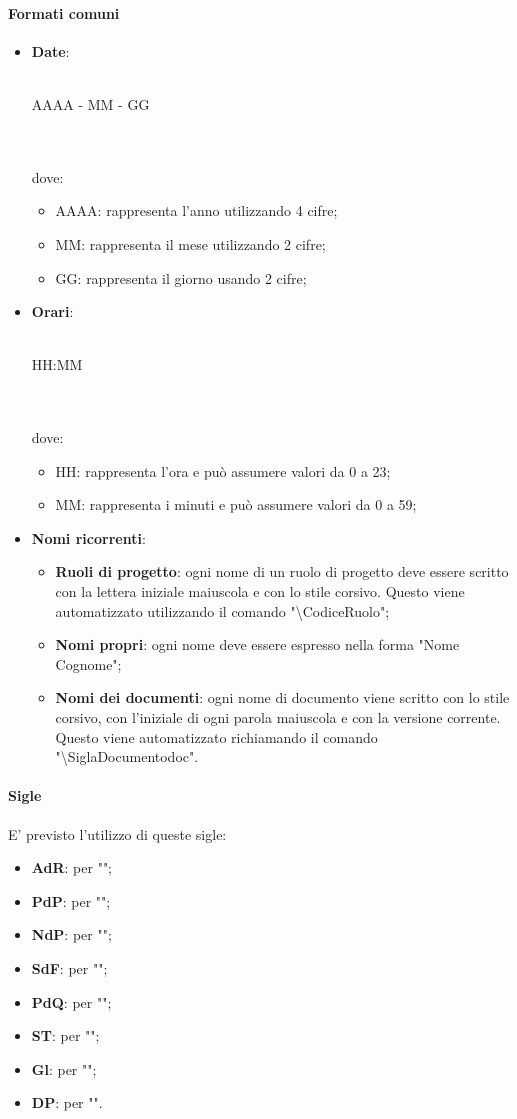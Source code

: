  \paragraph{Formati comuni}
\begin{itemize}
	\item \textbf{Date}:\\ \\ \centerline{AAAA - MM - GG} \\ \\
	dove:
	\begin{itemize}
		\item AAAA: rappresenta l'anno utilizzando 4 cifre;
		\item MM: rappresenta il mese utilizzando 2 cifre;
		\item GG: rappresenta il giorno usando 2 cifre;
	\end{itemize}
	\item \textbf{Orari}:\\ \\ \centerline{HH:MM} \\ \\dove:
	\begin{itemize}
		\item HH: rappresenta l'ora e può assumere valori da 0 a 23;
		\item MM: rappresenta i minuti e può assumere valori da 0 a 59;
	\end{itemize}
	\item \textbf{Nomi ricorrenti}:
	\begin{itemize}
		\item \textbf{Ruoli di progetto}: ogni nome di un ruolo di progetto deve essere scritto con la lettera iniziale maiuscola e con lo stile corsivo. Questo viene automatizzato utilizzando il comando "\textbackslash{CodiceRuolo}";
		\item \textbf{Nomi propri}: ogni nome deve essere espresso nella forma "Nome Cognome";
		\item \textbf{Nomi dei documenti}: ogni nome di documento viene scritto con lo stile corsivo, con l'iniziale di ogni parola maiuscola e con la versione corrente. Questo viene automatizzato richiamando il comando "\textbackslash{SiglaDocumentodoc}".
	\end{itemize}
\end{itemize}
 \paragraph{Sigle}
E' previsto l'utilizzo di queste sigle:
\begin{itemize}
	\item \textbf{AdR}: per "\ARdoc";
	\item \textbf{PdP}: per "\PPdoc";
	\item \textbf{NdP}: per "\NPdoc";
	\item \textbf{SdF}: per "\SFdoc";
	\item \textbf{PdQ}: per "\PQdoc";
	\item \textbf{ST}: per "\STdoc";
	\item \textbf{Gl}: per "\Gldoc";
	\item \textbf{DP}: per "\DPdoc".		
\end{itemize}
 
